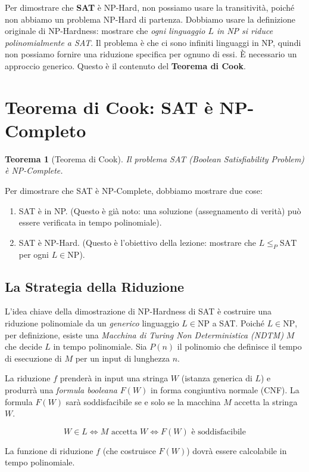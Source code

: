\documentclass[a4paper]{article}
\newtheorem{theorem}{Teorema}
\begin{document}
Per dimostrare che \textbf{SAT} è NP-Hard, non possiamo usare la transitività, poiché non abbiamo un problema NP-Hard di partenza. Dobbiamo usare la definizione originale di NP-Hardness: mostrare che \emph{ogni linguaggio $L$ in NP si riduce polinomialmente a SAT}.
Il problema è che ci sono infiniti linguaggi in NP, quindi non possiamo fornire una riduzione specifica per ognuno di essi. È necessario un approccio generico. Questo è il contenuto del \textbf{Teorema di Cook}.

\section{Teorema di Cook: SAT è NP-Completo}

\begin{theorem}[Teorema di Cook]
Il problema SAT (Boolean Satisfiability Problem) è NP-Complete.
\end{theorem}

Per dimostrare che SAT è NP-Complete, dobbiamo mostrare due cose:
\begin{enumerate}
    \item SAT è in NP. (Questo è già noto: una soluzione (assegnamento di verità) può essere verificata in tempo polinomiale).
    \item SAT è NP-Hard. (Questo è l'obiettivo della lezione: mostrare che $L \le_P \text{SAT}$ per ogni $L \in \text{NP}$).
\end{enumerate}

\subsection{La Strategia della Riduzione}
L'idea chiave della dimostrazione di NP-Hardness di SAT è costruire una riduzione polinomiale da un \emph{generico} linguaggio $L \in \text{NP}$ a SAT.
Poiché $L \in \text{NP}$, per definizione, esiste una \emph{Macchina di Turing Non Deterministica (NDTM)} $M$ che decide $L$ in tempo polinomiale. Sia $P(n)$ il polinomio che definisce il tempo di esecuzione di $M$ per un input di lunghezza $n$.

La riduzione $f$ prenderà in input una stringa $W$ (istanza generica di $L$) e produrrà una \emph{formula booleana} $F(W)$ in forma congiuntiva normale (CNF). La formula $F(W)$ sarà soddisfacibile se e solo se la macchina $M$ accetta la stringa $W$.

\[ W \in L \iff M \text{ accetta } W \iff F(W) \text{ è soddisfacibile} \]

La funzione di riduzione $f$ (che costruisce $F(W)$) dovrà essere calcolabile in tempo polinomiale.
\end{document}

